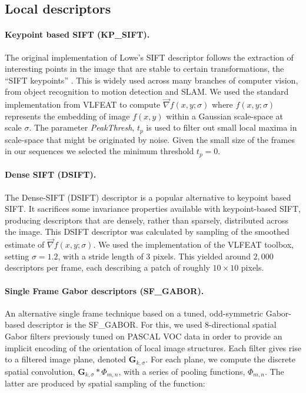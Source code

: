 \subsection{Local descriptors}
\label{sec:descriptors}

\paragraph{Keypoint based SIFT (KP\_SIFT).}

The original implementation of Lowe's SIFT descriptor follows the extraction of interesting points in the image that are stable to certain transformations, the ``SIFT keypoints'' \cite{Lowe2004}. This is widely used across many branches of computer vision, from object recognition to motion detection and SLAM. We used the standard implementation from VLFEAT \cite{Vedaldi2008} to compute $\vec{\nabla}f(x,y;\sigma)$ where $f(x,y;\sigma)$ represents the embedding of image $f(x,y)$ within a Gaussian scale-space at scale $\sigma$. The parameter \emph{PeakThresh}, $t_p$ is used to filter out small local maxima in scale-space that might be originated by noise. Given the small size of the frames in our sequences we selected the minimum threshold $t_p = 0$.

\paragraph{Dense SIFT (DSIFT).}

The Dense-SIFT (DSIFT) descriptor \citep{Lazebnik2006} is a popular  alternative to keypoint based SIFT. It sacrifices some invariance properties available with keypoint-based SIFT, producing descriptors that are densely, rather than sparsely, distributed across the image. This DSIFT descriptor was calculated by  sampling of the smoothed estimate of $\vec{\nabla}f(x,y;\sigma)$.  We used the implementation of the VLFEAT toolbox, setting $\sigma = 1.2$, with a stride length of 3 pixels. This  yielded around $2,000$ descriptors per frame, each describing a patch of roughly $10 \times 10$ pixels.  \\

\paragraph{Single Frame Gabor descriptors (SF\_GABOR).}

An alternative single frame technique based on a tuned, odd-symmetric Gabor-based descriptor is the SF\_GABOR. For this, we used $8$-directional spatial Gabor filters previously tuned on PASCAL VOC data \cite{Everingham2009} in order to provide an implicit encoding of the orientation of local image structures.  Each filter gives rise to a filtered image plane, denoted $\mathbf{G}_{k,\sigma}$.  For each plane, we compute the discrete spatial convolution, $\mathbf{G}_{k,\sigma} \ast {\Phi}_{m,n}$, with a series of pooling functions, ${\Phi}_{m,n}$. The latter are produced by spatial sampling of the function:

